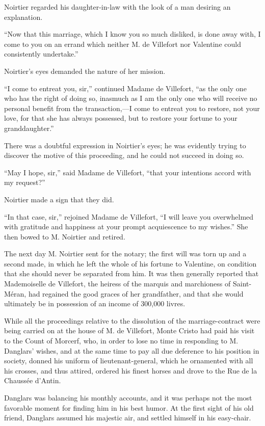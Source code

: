 Noirtier regarded his daughter-in-law with the look of a man desiring
an explanation.

“Now that this marriage, which I know you so much disliked, is done
away with, I come to you on an errand which neither M. de Villefort nor
Valentine could consistently undertake.”

Noirtier’s eyes demanded the nature of her mission.

“I come to entreat you, sir,” continued Madame de Villefort, “as the
only one who has the right of doing so, inasmuch as I am the only one
who will receive no personal benefit from the transaction,—I come to
entreat you to restore, not your love, for that she has always
possessed, but to restore your fortune to your granddaughter.”

There was a doubtful expression in Noirtier’s eyes; he was evidently
trying to discover the motive of this proceeding, and he could not
succeed in doing so.

“May I hope, sir,” said Madame de Villefort, “that your intentions
accord with my request?”

Noirtier made a sign that they did.

“In that case, sir,” rejoined Madame de Villefort, “I will leave you
overwhelmed with gratitude and happiness at your prompt acquiescence to
my wishes.” She then bowed to M. Noirtier and retired.

The next day M. Noirtier sent for the notary; the first will was torn
up and a second made, in which he left the whole of his fortune to
Valentine, on condition that she should never be separated from him. It
was then generally reported that Mademoiselle de Villefort, the heiress
of the marquis and marchioness of Saint-Méran, had regained the good
graces of her grandfather, and that she would ultimately be in
possession of an income of 300,000 livres.

While all the proceedings relative to the dissolution of the
marriage-contract were being carried on at the house of M. de
Villefort, Monte Cristo had paid his visit to the Count of Morcerf,
who, in order to lose no time in responding to M. Danglars’ wishes, and
at the same time to pay all due deference to his position in society,
donned his uniform of lieutenant-general, which he ornamented with all
his crosses, and thus attired, ordered his finest horses and drove to
the Rue de la Chaussée d’Antin.

Danglars was balancing his monthly accounts, and it was perhaps not the
most favorable moment for finding him in his best humor. At the first
sight of his old friend, Danglars assumed his majestic air, and settled
himself in his easy-chair.


